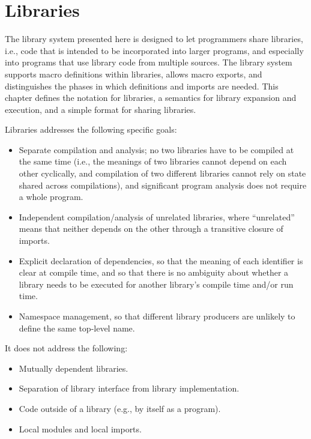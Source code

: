 \chapter{Libraries}

The library system presented here is designed to let programmers share
libraries, i.e., code that is intended to be incorporated into larger
programs, and especially into programs that use library code from multiple
sources.  The library system supports macro definitions within libraries,
allows macro exports, and distinguishes the phases in which definitions
and imports are needed.  This chapter defines the notation for
libraries, a semantics for library expansion and execution, and a simple
format for sharing libraries.

Libraries addresses the following specific goals:

\begin{itemize}
\item Separate compilation and analysis; no two libraries have to be
  compiled at the same time (i.e., the meanings of two libraries
  cannot depend on each other cyclically, and compilation of two
  different libraries cannot rely on state shared across
  compilations), and significant program analysis does not require a
  whole program.
\item Independent compilation/analysis of unrelated libraries, where
  ``unrelated'' means that neither depends on the other through a
  transitive closure of imports.
\item Explicit declaration of dependencies, so that the meaning of
  each identifier is clear at compile time, and so that there is no
  ambiguity about whether a library needs to be executed for another
  library's compile time and/or run time.
\item Namespace management, so that different library producers are
  unlikely to define the same top-level name.
\end{itemize}

It does not address the following:

\begin{itemize}
\item Mutually dependent libraries.
\item Separation of library interface from library implementation.
\item Code outside of a library (e.g., {} by itself as a program).
\item Local modules and local imports. 
\end{itemize}

